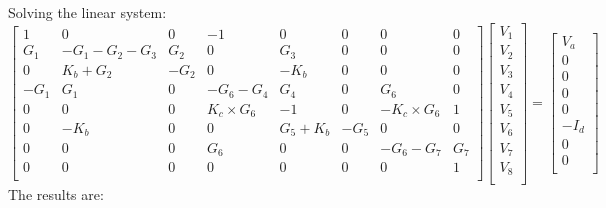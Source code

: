 Solving the linear system: 
$$
\begin{bmatrix} 
1  &  0 & 0 & -1 & 0 & 0 & 0 & 0       \\
G_1 & -G_1-G_2-G_3 & G_2 & 0 & G_3 & 0 & 0 & 0      \\
0 & K_b+G_2 & -G_2 & 0 & -K_b & 0 & 0 & 0\\   
-G_1 & G_1 & 0  & -G_6-G_4 & G_4 & 0 & G_6 & 0      \\
0 & 0 & 0 & K_c \times G_6 & -1 & 0 & -K_c \times G_6 & 1 \\
0 & -K_b & 0 & 0 & G_5+K_b & -G_5 & 0 & 0 \\
0&0&0&G_6&0&0&-G_6-G_7&G_7\\
0 & 0 & 0 & 0 & 0 & 0 & 0 & 1\\
\end{bmatrix}
\begin{bmatrix} 
V_1     \\
V_2    \\
V_3   \\
V_4     \\
V_5     \\
V_6     \\
V_7     \\
V_8     \\
\end{bmatrix}
=
\begin{bmatrix} 
V_a   \\
0    \\
0  \\
0  \\
0  \\
-I_d   \\
0  \\
0  \\
\end{bmatrix}
\quad
$$
The results are:

